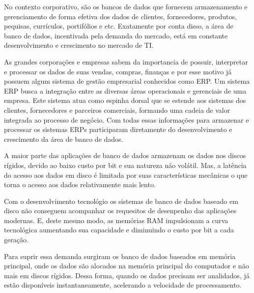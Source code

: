 No contexto corporativo, são os bancos de dados que fornecem armazenamento e gerenciamento de forma efetiva dos dados de clientes, fornecedores, produtos, pequisas, currículos, portifólios e etc. Exatamente por conta disso, a área de banco de dados, incentivada pela demanda do mercado, está em constante desenvolvimento e crescimento no mercado de \ac{TI}.

As grandes corporações e empresas sabem da importancia de possuir, interpretar e processar os dados de suas vendas, compras, finanças e por esse motivo já possuem algum sistema de gestão empresarial conhecidos como \ac{ERP}. Um sistema ERP busca a  integração  entre  as  diversas  áreas  operacionais
e gerenciais de uma empresa. Este sistema atua como espinha dorsal que se estende aos sistemas dos clientes, fornecedores e parceiros comerciais, formando uma cadeia de valor integrada ao processo de negócio. Com todas essas informações para armazenar e processar os sistemas ERPs participaram diretamente do desenvolvimento e crescimento da área de banco de dados. 

A maior parte das aplicações de banco de dados armazenam os dados nos discos rígidos, devido ao baixo custo por bit e sua natureza não volátil. Mas, a latência do acesso aos dados em disco é limitada por suas características mecânicas o que torna o acesso aos dados relativamente mais lento. 

Com o desenvolvimento tecnológio os sistemas de banco de dados baseado em disco não conseguem acompanhar os requesitos de desenpenho das aplicações modernas. E, deste mesmo modo, as memórias RAM impulsionam a curva tecnológica aumentando sua capacidade e diminuindo o custo por bit a cada geração. \cite{ravinair}

Para suprir essa demanda surgiram os banco de dados baseados em memória principal, onde os dados são alocados na memória principal do computador e não mais em discos rígidos. Dessa forma, quando os dados precisam ser analidados, já estão disponíveis instantaneamente, acelerando a velocidade de processamento.



